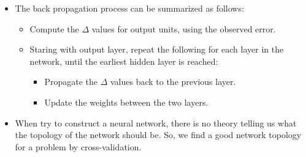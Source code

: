\documentclass[10pt]{article}
\begin{document}
\begin{itemize}
    \item The back propagation process can be summarized
        as follows:
        \begin{itemize}
            \item Compute the $\Delta$ values for output units, 
            using the observed error.
            \item Staring with output layer, repeat the following
            for each layer in the network, until the earliest
            hidden layer is reached:
            \begin{itemize}
                \item Propagate the $\Delta$ values back to the
                    previous layer.
                \item Update the weights between the two layers.
            \end{itemize}
        \end{itemize}
        
    \item When try to construct a neural network, there is 
        no theory telling us what the topology of the network
        should be. So, we find a good network topology for 
        a problem by cross-validation.
        
\end{itemize}
\end{document}
